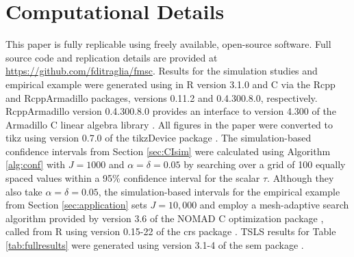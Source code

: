 \section{Computational Details}
\label{append:comp}
This paper is fully replicable using freely available, open-source software.
Full source code and replication details are provided at \url{https://github.com/fditraglia/fmsc}.
Results for the simulation studies and empirical example were generated using in R version 3.1.0 \citep{R} and C\raisebox{0.5ex}{\tiny\textbf{++}} via the Rcpp \citep{RcppArticle,RcppBook} and RcppArmadillo \citep{RcppArmadillo} packages, versions 0.11.2 and 0.4.300.8.0, respectively.
RcppArmadillo version 0.4.300.8.0 provides an interface to version 4.300 of the Armadillo C\raisebox{0.5ex}{\tiny\textbf{++}} linear algebra library \citep{Armadillo}.
All figures in the paper were converted to tikz using version 0.7.0 of the tikzDevice package \citep{tikzDevice}.
The simulation-based confidence intervals from Section \ref{sec:CIsim} were calculated using Algorithm \ref{alg:conf} with $J = 1000$ and $\alpha = \delta = 0.05$ by searching over a grid of 100 equally spaced values within a 95\% confidence interval for the scalar $\tau$.
Although they also take $\alpha = \delta = 0.05$, the simulation-based intervals for the empirical example from Section \ref{sec:application} sets $J = 10,000$ and employ a mesh-adaptive search algorithm provided by version 3.6 of the NOMAD C\raisebox{0.5ex}{\tiny\textbf{++}} optimization package \citep{NOMADalgorithm,NOMADcode,NOMADuserguide}, called from R using version 0.15-22 of the crs package \citep{crs}.
TSLS results for Table \ref{tab:fullresults} were generated using version 3.1-4 of the sem package \citep{sem}.